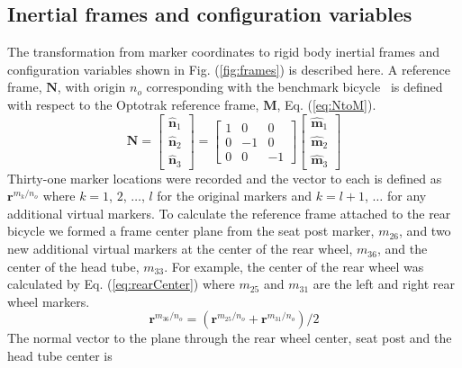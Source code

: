 \documentclass[smallextended]{svjour3}     %
\begin{document}
\begin{appendices}
\section{Inertial frames and configuration variables}
\label{sec:inFrames}
The transformation from marker coordinates to rigid body inertial frames and
configuration variables shown in Fig. (\ref{fig:frames}) is described here. A
reference frame, $\mathbf{N}$, with origin $n_o$ corresponding with the
benchmark bicycle~\cite{Meijaard2007} is defined with respect to the Optotrak
reference frame, $\mathbf{M}$, Eq. (\ref{eq:NtoM}).
\begin{equation}
    \mathbf{N}=
    \left[
    \begin{array}{c}
    \hat{\mathbf{n}}_1\\
    \hat{\mathbf{n}}_2\\
    \hat{\mathbf{n}}_3
  \end{array}
    \right]
    =
    \left[
    \begin{array}{rrr}
    1 &  0 &  0\\
    0 & -1 &  0\\
    0 &  0 & -1
    \end{array}
    \right]
    \left[
    \begin{array}{c}
    \hat{\mathbf{m}}_1\\
    \hat{\mathbf{m}}_2\\
    \hat{\mathbf{m}}_3
  \end{array}
    \right]
\label{eq:NtoM}
\end{equation}
Thirty-one marker locations were recorded and the vector to each is defined as
$\mathbf{r}^{{m_{k}}/{n_o}}$ where $k=1$, $2$, $\ldots$, $l$ for the original
markers and $k=l+1$, $\ldots$ for any additional virtual markers.  To calculate
the reference frame attached to the rear bicycle we formed a frame center plane
from the seat post marker, $m_{26}$, and two new additional virtual markers at
the center of the rear wheel, $m_{36}$, and the center of the head tube,
$m_{33}$. For example, the center of the rear wheel was calculated by Eq.
(\ref{eq:rearCenter}) where $m_{25}$ and $m_{31}$ are the left and right rear
wheel markers.
\begin{equation}
    \mathbf{r}^{{m_{36}}/{n_o}}=(\mathbf{r}^{{m_{25}}/{n_o}}+\mathbf{r}^{{m_{31}}/{n_o}})/2
\label{eq:rearCenter}
\end{equation}
The normal vector to the plane through the rear wheel center, seat post and the
head tube center is

\end{appendices}
\end{document}
